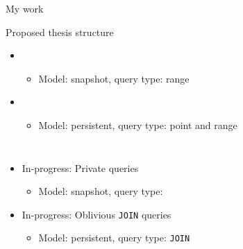 	\begin{frame}{My work}

		\begin{block}{Proposed thesis structure}

			\vspace*{-1ex}

			\begin{itemize}[label={}]
				\setlength\itemsep{-0ex}

				\item<1> 

					\begin{itemize}[label={}]
						\item \small Model: \alert{snapshot}, query type: \alert{range} \normalsize
					\end{itemize}

				\item<2> 

					\begin{itemize}[label={}]
						\item \small Model: \alert{persistent}, query type: \alert{point} and \alert{range} \normalsize
					\end{itemize}

			\end{itemize}

			\begin{columns}[T,onlytextwidth]

					\vspace*{-0.5ex}

					\begin{itemize}[label={}]
						\item<3> In-progress: Private \knn{} queries

						\begin{itemize}[label={}]
							\item \small Model: \alert{snapshot}, query type: \alert{\knn{}} \normalsize
						\end{itemize}

						\item<4> In-progress: Oblivious \texttt{JOIN} queries

						\begin{itemize}[label={}]
							\item \small Model: \alert{persistent}, query type: \alert{\texttt{JOIN}} \normalsize
						\end{itemize}

					\end{itemize}



			\end{columns}

		\end{block}

	\end{frame}
